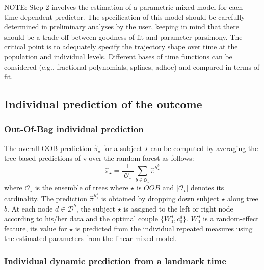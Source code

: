NOTE: Step 2 involves the estimation of a parametric mixed model for each time-dependent predictor. The specification of this model should be carefully determined in preliminary analyses by the user, keeping in mind that there should be a trade-off between goodness-of-fit and parameter parsimony. The critical point is to adequately specify the trajectory shape over time at the population and individual levels. Different bases of time functions can be considered (e.g., fractional polynomials, splines, adhoc) and compared in terms of fit.

\subsection{Individual prediction of the outcome}\label{individual-prediction-of-the-outcome}

\subsubsection{Out-Of-Bag individual prediction}\label{out-of-bag-individual-prediction}

The overall OOB prediction \(\hat{\pi}_{ \star}\) for a subject \(\star\) can be computed by averaging the tree-based predictions of \(\star\) over the random forest as follows:
\begin{equation}
  \hat{\pi}_{ \star} = \frac{1}{|\mathcal{O}_\star|} \sum_{b \in \mathcal{O}_\star} \hat{\pi}^{h_\star^b}
\end{equation}
where \(\mathcal{O}_\star\) is the ensemble of trees where \(\star\) is \(OOB\) and \(|\mathcal{O}_\star|\) denotes its cardinality. The prediction \(\hat{\pi}^{h_\star^b}\) is obtained by dropping down subject \(\star\) along tree \(b\). At each node \(d \in \mathcal{D}^b\), the subject \(\star\) is assigned to the left or right node according to his/her data and the optimal couple \(\{W_0^d,c_0^d\}\). \(W_0^d\) is a random-effect feature, its value for \(\star\) is predicted from the individual repeated measures using the estimated parameters from the linear mixed model.

\subsubsection{Individual dynamic prediction from a landmark time}\label{individual-dynamic-prediction-from-a-landmark-time}

